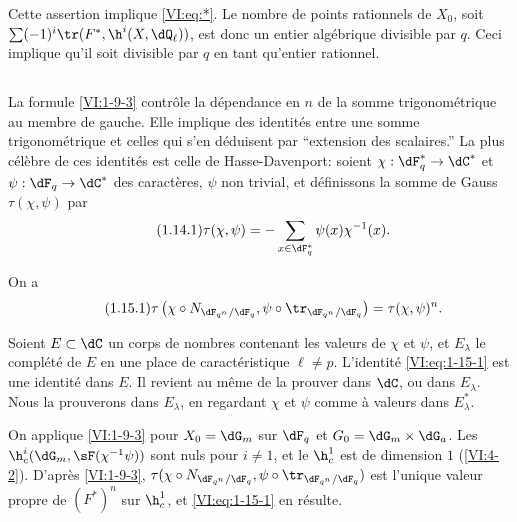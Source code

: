 Cette assertion implique \eqref{VI:eq:*}. Le nombre de points rationnels de 
$X_0$, soit $\sum (-1)^i \tr(F^\ast,\h^i(X,\dQ_\ell))$, est donc un entier 
algébrique divisible par $q$. Ceci implique qu'il soit divisible par $q$ en 
tant qu'entier rationnel. 





\subsection{}\label{VI:1-14}

La formule \ref{VI:1-9-3} contrôle la dépendance en $n$ de la somme 
trigonométrique au membre de gauche. Elle implique des identités entre une 
somme trigonométrique et celles qui s'en déduisent par ``extension des 
scalaires.'' La plus célèbre de ces identités est celle de 
Hasse-Davenport: soient $\chi:\dF_q^\ast \to \dC^\ast$ et 
$\psi:\dF_q\to \dC^\ast$ des caractères, $\psi$ non trivial, et 
définissons la somme de Gauss $\tau(\chi,\psi)$ par 
\begin{equation*}\tag{1.14.1}\label{VI:eq:1-14-1}
  \tau(\chi,\psi) = - \sum_{x\in \dF_q^\ast} \psi(x) \chi^{-1}(x) \text{.}
\end{equation*}





\begin{theorem_}\label{VI:1-15}
On a 
\begin{equation*}\tag{1.15.1}\label{VI:eq:1-15-1}
  \tau\left(\chi\circ N_{\dF_{q^n}/\dF_q},\psi\circ \tr_{\dF_{q^n}/\dF_q}\right) = \tau(\chi,\psi)^n \text{.}
\end{equation*}
\end{theorem_}

Soient $E\subset \dC$ un corps de nombres contenant les valeurs de $\chi$ et 
$\psi$, et $E_\lambda$ le complété de $E$ en une place de caractéristique 
$\ell\ne p$. L'identité \eqref{VI:eq:1-15-1} est une identité dans $E$. Il 
revient au même de la prouver dans $\dC$, ou dans $E_\lambda$. Nous la 
prouverons dans $E_\lambda$, en regardant $\chi$ et $\psi$ comme à valeurs 
dans $E_\lambda^\ast$. 

On applique \ref{VI:1-9-3} pour $X_0=\dG_m$ sur $\dF_q$ et 
$G_0=\dG_m\times \dG_a$. Les $\h_c^i(\dG_m,\sF(\chi^{-1}\psi))$ sont nuls pour 
$i\ne 1$, et le $\h_c^1$ est de dimension $1$ (\ref{VI:4-2}). D'après 
\ref{VI:1-9-3}, 
$\tau(\chi\circ N_{\dF_{q^n}/\dF_q},\psi\circ \tr_{\dF_{q^n}/\dF_q})$ est 
l'unique valeur propre de $(F^\ast)^n$ sur $\h_c^1$, et \eqref{VI:eq:1-15-1} en 
résulte. 

